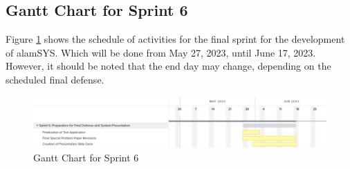 \subsection{Gantt Chart for Sprint 6}
\label{subsec:gantt_chart_sprint6}
Figure \ref{fig:gantt_chart_sprint6} shows the schedule of activities for the final sprint 
for the development of alamSYS. Which will be done from May 27, 2023, 
until June 17, 2023. However, it should be noted that the end day may change, 
depending on the scheduled final defense.
\begin{figure}[ht]
    \centering
    \includegraphics[width=1\textwidth]{./assets/Gantt_Chart_Sprint6.png}
    \caption{Gantt Chart for Sprint 6}
    \label{fig:gantt_chart_sprint6}
\end{figure}
\FloatBarrier